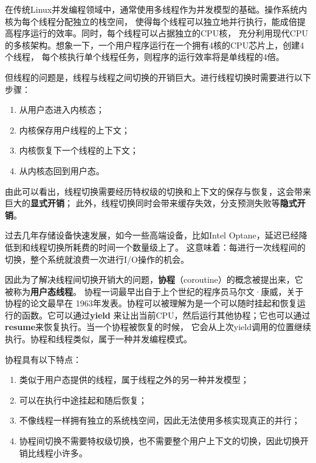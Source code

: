 \documentclass[supercite]{HustGraduPaper}
\theoremstyle{definition}
\begin{document}

在传统Linux并发编程领域中，通常使用多线程作为并发模型的基础。操作系统内核为每个线程分配独立的栈空间，
使得每个线程可以独立地并行执行，能成倍提高程序运行的效率。同时，每个线程可以占据独立的CPU核，
充分利用现代CPU的多核架构\cite{hong2011efficient}。想象一下，一个用户程序运行在一个拥有4核的CPU芯片上，创建4个线程，
每个核执行单个线程任务，则程序的运行效率将是单线程的4倍。\par

但线程的问题是，线程与线程之间切换的开销巨大\cite{david2007context}。进行线程切换时需要进行以下步骤：

\begin{enumerate}[label={(\arabic*)}]
  \item 从用户态进入内核态；
  \item 内核保存用户线程的上下文；
  \item 内核恢复下一个线程的上下文；
  \item 从内核态回到用户态。
\end{enumerate}

由此可以看出，线程切换需要经历特权级的切换和上下文的保存与恢复，这会带来巨大的\textbf{显式开销}；
此外，线程切换同时会带来缓存失效，分支预测\cite{smith1998study}失败等\textbf{隐式开销}。\par

过去几年存储设备快速发展，如今一些高端设备，比如Intel Optane\cite{izraelevitz2019basic}，延迟已经降低到和线程切换所耗费的时间一个数量级上了。
这意味着：每进行一次线程间的切换，整个系统就浪费一次进行I/O操作的机会。\par

因此为了解决线程间切换开销大的问题，\textbf{协程}（coroutine）的概念被提出来，它被称为\textbf{用户态线程}。
协程一词最早出自于上个世纪的程序员马尔文·康威，关于协程的论文\cite{paper1}最早在
1963年发表。协程可以被理解为是一个可以随时挂起和恢复运行的函数。它可以通过\textbf{yield}
来让出当前CPU，然后运行其他协程；它也可以通过\textbf{resume}来恢复执行。当一个协程被恢复的时候，
它会从上次yield调用的位置继续执行。协程和线程类似，属于一种并发编程模式。\par

协程具有以下特点：

\begin{enumerate}[label={(\arabic*)}]
  \item 类似于用户态提供的线程，属于线程之外的另一种并发模型；
  \item 可以在执行中途挂起和随后恢复；
  \item 不像线程一样拥有独立的系统栈空间，因此无法使用多核实现真正的并行；
  \item 协程间切换不需要特权级切换，也不需要整个用户上下文的切换，因此切换开销比线程小许多。
\end{enumerate}
\end{document}
